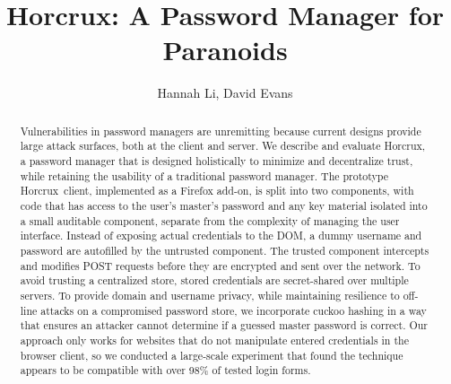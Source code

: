 \documentclass[sigconf]{acmart}
\newcommand*\SecPass{Horcrux}
\begin{document}
\title{Horcrux: A Password Manager for Paranoids}

\author{Hannah Li, David Evans}

\begin{abstract}
Vulnerabilities in password managers are unremitting because current designs provide large attack surfaces, both at the client and server. We describe and evaluate \SecPass, a password manager that is designed holistically to minimize and decentralize trust, while retaining the usability of a traditional password manager. The prototype \SecPass\ client, implemented as a Firefox add-on, is split into two components, with code that has access to the user's master's password and any key material isolated into a small auditable component, separate from the complexity of managing the user interface. Instead of exposing actual credentials to the DOM, a dummy username and password are autofilled by the untrusted component. The trusted component intercepts and modifies POST requests before they are encrypted and sent over the network. To avoid trusting a centralized store, stored credentials are secret-shared over multiple servers. To provide domain and username privacy, while maintaining resilience to off-line attacks on a compromised password store, we incorporate cuckoo hashing in a way that ensures an attacker cannot determine if a guessed master password is correct. Our approach only works for websites that do not manipulate entered credentials in the browser client, so we conducted a large-scale experiment that found the technique appears to be compatible with over 98\% of tested login forms.
\end{abstract}

%
%


\maketitle
\end{document}
